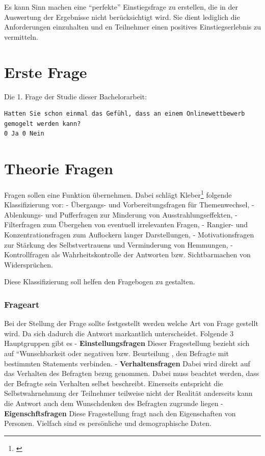 Es kann Sinn machen eine ``perfekte'' Einstiegsfrage zu erstellen, die
in der Auswertung der Ergebnisse nicht berücksichtigt wird. Sie dient
lediglich die Anforderungen einzuhalten und en Teilnehmer einen
positives Einstiegserlebnis zu vermitteln.

\section{Erste Frage}\label{erste-frage}

Die 1. Frage der Studie dieser Bachelorarbeit:

\begin{verbatim}
Hatten Sie schon einmal das Gefühl, dass an einem Onlinewettbewerb 
gemogelt werden kann?
0 Ja 0 Nein
\end{verbatim}

\newpage

\section{Theorie Fragen}\label{theorie-fragen}

Fragen sollen eine Funktion übernehmen. Dabei schlägt Kleber\footnote{\autocite{kleber92}}
folgende Klassifizierung vor: - Übergangs- und Vorbereitungsfragen für
Themenwechsel, - Ablenkungs- und Pufferfragen zur Minderung von
Ausstrahlungseffekten, - Filterfragen zum Übergehen von eventuell
irrelevanten Fragen, - Rangier- und Konzentrationsfragen zum Auflockern
langer Darstellungen, - Motivationsfragen zur Stärkung des
Selbstvertrauens und Verminderung von Hemmungen, - Kontrollfragen als
Wahrheitskontrolle der Antworten bzw. Sichtbarmachen von Widersprüchen.

Diese Klassifizierung soll helfen den Fragebogen zu gestalten.

\subsubsection{Frageart}\label{frageart}

Bei der Stellung der Frage sollte festgestellt werden welche Art von
Frage gestellt wird. Da sich dadurch die Antwort markantlich
unterscheidet. Folgende 3 Hauptgruppen gibt es -
\textbf{Einstellungsfragen} Dieser Fragestellung bezieht sich auf
``Wunschbarkeit oder negativen bzw. Beurteilung , den Befragte mit
bestimmten Statements verbinden. - \textbf{Verhaltensfragen} Dabei wird
direkt auf das Verhalten des Befragten bezug genommen. Dabei muss
beachtet werden, dass der Befragte sein Verhalten selbst beschreibt.
Einerseits entspricht die Selbstwahrnehmung der Teilnehmer teilweise
nicht der Realität anderseits kann die Antwort auch dem Wunschdenken des
Befragten zugrunde liegen - \textbf{Eigenschftsfragen} Diese
Fragestellung fragt nach den Eigenschaften von Personen. Vielfach sind
es persönliche und demographische Daten.

